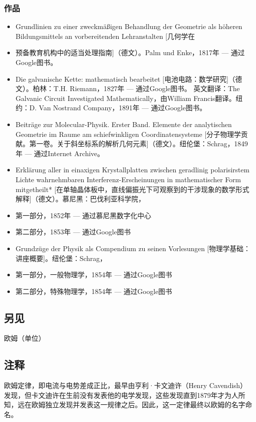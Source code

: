 \subsubsection{作品}  
\begin{itemize}
\item Grundlinien zu einer zweckmäßigen Behandlung der Geometrie als höheren Bildungsmittels an vorbereitenden Lehranstalten [几何学在\item 预备教育机构中的适当处理指南]（德文）。Palm und Enke，1817年 — 通过Google图书。  
\item Die galvanische Kette: mathematisch bearbeitet [电池电路：数学研究]（德文）。柏林：T.H. Riemann，1827年 — 通过Google图书。  
英文翻译：The Galvanic Circuit Investigated Mathematically，由William Francis翻译。纽约：D. Van Nostrand Company，1891年 — 通过Google图书。
\item Beiträge zur Molecular-Physik. Erster Band. Elemente der analytischen Geometrie im Raume am schiefwinkligen Coordinatensysteme [分子物理学贡献。第一卷。关于斜坐标系的解析几何元素]（德文）。纽伦堡：Schrag，1849年 — 通过Internet Archive。  
\item Erklärung aller in einaxigen Krystallplatten zwischen geradlinig polarisirstem Lichte wahrnehmbaren Interferenz-Erscheinungen in mathematischer Form mitgetheilt* [在单轴晶体板中，直线偏振光下可观察到的干涉现象的数学形式解释]（德文）。慕尼黑：巴伐利亚科学院，  
\item 第一部分，1852年 — 通过慕尼黑数字化中心  
\item 第二部分，1853年 — 通过Google图书 
\item Grundzüge der Physik als Compendium zu seinen Vorlesungen [物理学基础：讲座概要]。纽伦堡：Schrag，  
\item 第一部分，一般物理学，1854年 — 通过Google图书  
\item 第二部分，特殊物理学，1854年 — 通过Google图书
\end{itemize}
\subsection{另见}  
欧姆（单位）
\subsection{注释} 
欧姆定律，即电流与电势差成正比，最早由亨利·卡文迪许（Henry Cavendish）发现，但卡文迪许在生前没有发表他的电学发现，这些发现直到1879年才为人所知，远在欧姆独立发现并发表这一规律之后。因此，这一定律最终以欧姆的名字命名。